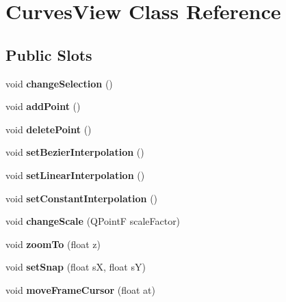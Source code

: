\hypertarget{class_curves_view}{
\section{\-Curves\-View \-Class \-Reference}
\label{class_curves_view}
}
\subsection*{\-Public \-Slots}
\begin{DoxyCompactItemize}
\item 
\hypertarget{class_curves_view_ad6cf06f560c01be87d3b41f1abc14f0e}{
void {\bfseries change\-Selection} ()}
\label{class_curves_view_ad6cf06f560c01be87d3b41f1abc14f0e}

\item 
\hypertarget{class_curves_view_ace3964c0ee3dfd27292fca730eef33d9}{
void {\bfseries add\-Point} ()}
\label{class_curves_view_ace3964c0ee3dfd27292fca730eef33d9}

\item 
\hypertarget{class_curves_view_af6701f458bf23d983dd02ea817c17762}{
void {\bfseries delete\-Point} ()}
\label{class_curves_view_af6701f458bf23d983dd02ea817c17762}

\item 
\hypertarget{class_curves_view_a7a407c5095662ba0c2bf6f0ad443009b}{
void {\bfseries set\-Bezier\-Interpolation} ()}
\label{class_curves_view_a7a407c5095662ba0c2bf6f0ad443009b}

\item 
\hypertarget{class_curves_view_a06744f1bf69cd5c082e439950ace8ee3}{
void {\bfseries set\-Linear\-Interpolation} ()}
\label{class_curves_view_a06744f1bf69cd5c082e439950ace8ee3}

\item 
\hypertarget{class_curves_view_a6f7a92b8c1f82ab2cb898e1b396a0a15}{
void {\bfseries set\-Constant\-Interpolation} ()}
\label{class_curves_view_a6f7a92b8c1f82ab2cb898e1b396a0a15}

\item 
\hypertarget{class_curves_view_af87ba9d0c7802802557a59b6f07293a6}{
void {\bfseries change\-Scale} (\-Q\-Point\-F scale\-Factor)}
\label{class_curves_view_af87ba9d0c7802802557a59b6f07293a6}

\item 
\hypertarget{class_curves_view_a2a0fc565c04dcba10b472d49595be3d9}{
void {\bfseries zoom\-To} (float z)}
\label{class_curves_view_a2a0fc565c04dcba10b472d49595be3d9}

\item 
\hypertarget{class_curves_view_a0dbdfdac1c69405a7704e92b0d0940c5}{
void {\bfseries set\-Snap} (float s\-X, float s\-Y)}
\label{class_curves_view_a0dbdfdac1c69405a7704e92b0d0940c5}

\item 
\hypertarget{class_curves_view_ae4216420ed0fee71a7a9273cd9582369}{
void {\bfseries move\-Frame\-Cursor} (float at)}
\label{class_curves_view_ae4216420ed0fee71a7a9273cd9582369}

\end{DoxyCompactItemize}
